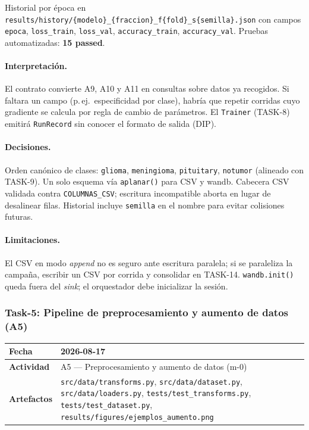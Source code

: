 Historial por época en \texttt{results/history/\{modelo\}\_\{fraccion\}\_f\{fold\}\_s\{semilla\}.json}
con campos \texttt{epoca}, \texttt{loss\_train}, \texttt{loss\_val}, \texttt{accuracy\_train},
\texttt{accuracy\_val}. Pruebas automatizadas: \textbf{15 passed}.

\paragraph{Interpretación.}
El contrato convierte A9, A10 y A11 en consultas sobre datos ya recogidos. Si faltara
un campo (p.\,ej.\ especificidad por clase), habría que repetir corridas cuyo gradiente
se calcula por regla de cambio de parámetros. El \texttt{Trainer} (TASK-8) emitirá
\texttt{RunRecord} sin conocer el formato de salida (DIP).

\paragraph{Decisiones.}
Orden canónico de clases: \texttt{glioma}, \texttt{meningioma}, \texttt{pituitary},
\texttt{notumor} (alineado con TASK-9). Un solo esquema vía \texttt{aplanar()} para CSV
y wandb. Cabecera CSV validada contra \texttt{COLUMNAS\_CSV}; escritura incompatible
aborta en lugar de desalinear filas. Historial incluye \texttt{semilla} en el nombre
para evitar colisiones futuras.

\paragraph{Limitaciones.}
El CSV en modo \textit{append} no es seguro ante escritura paralela; si se paraleliza la
campaña, escribir un CSV por corrida y consolidar en TASK-14. \texttt{wandb.init()} queda
fuera del \textit{sink}; el orquestador debe inicializar la sesión.

\subsubsection{Task-5: Pipeline de preprocesamiento y aumento de datos (A5)}
\label{hallazgo:task-5}
\begin{tabularx}{\textwidth}{|l|X|}\hline
\textbf{Fecha} & 2026-08-17 \\\hline
\textbf{Actividad} & A5 --- Preprocesamiento y aumento de datos (m-0) \\\hline
\textbf{Artefactos} & \texttt{src/data/transforms.py}, \texttt{src/data/dataset.py}, \texttt{src/data/loaders.py}, \texttt{tests/test\_transforms.py}, \texttt{tests/test\_dataset.py}, \texttt{results/figures/ejemplos\_aumento.png} \\\hline
\end{tabularx}

